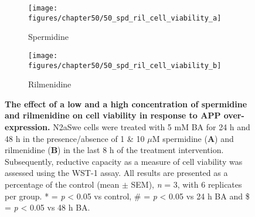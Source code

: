 \begin{figure}[!htbp]
  \centering
  \begin{subfigure}[b]{0.495\linewidth}
    \texttt{[image: figures/chapter50/50\_spd\_ril\_cell\_viability\_a]}
    \caption{Spermidine}
  \end{subfigure}
  \begin{subfigure}[b]{0.495\linewidth}
    \texttt{[image: figures/chapter50/50\_spd\_ril\_cell\_viability\_b]}
    \caption{Rilmenidine}
  \end{subfigure}
  \caption[ The effect of a low and a high concentration of spermidine and rilmenidine on cell viability in response to APP over-expression]{\textbf{The effect of a low and a high concentration of spermidine and rilmenidine on cell viability in response to APP over-expression.} N2aSwe cells were treated with 5 mM BA for 24 h and 48 h in the presence/absence of 1 \& 10 $\mu$M spermidine (\textbf{A}) and rilmenidine (\textbf{B}) in the last 8 h of the treatment intervention. Subsequently, reductive capacity as a measure of cell viability was assessed using the WST-1 assay. All results are presented as a percentage of the control (mean $\pm$ SEM), \textit{n} = 3, with 6 replicates per group. * = \textit{p} < 0.05 vs control, \# = \textit{p} < 0.05 vs 24 h BA and \$ = \textit{p} < 0.05 vs 48 h BA.}
  \label{fig:50_spd_ril_cell_viability_a}
\end{figure}

